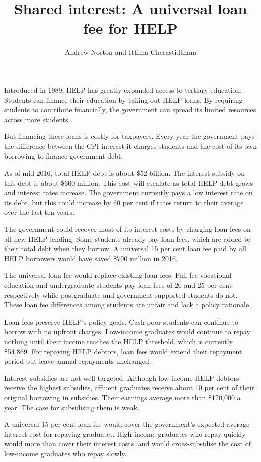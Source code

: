 \documentclass[embargoed]{grattan}
\title{Shared interest: A universal loan fee for HELP}
\author{Andrew Norton and Ittima Cherastidtham}
\begin{document}
\setlength{\overviewExtra}{-2pt}
\begin{overview}
Introduced in 1989, HELP has greatly expanded access to tertiary education. Students can finance their education by taking out HELP loans. By requiring students to contribute financially, the government can spread its limited resources across more students.

But financing these loans is costly for taxpayers. Every year the government pays the difference between the CPI interest it charges students and the cost of its own borrowing to finance government debt.

As of mid-2016, total HELP debt is about \$52 billion. The interest subsidy on this debt is about \$600 million. This cost will escalate as total HELP debt grows and interest rates increase. The government currently pays a low interest rate on its debt, but this could increase by 60 per cent if rates return to their average over the last ten years.

The government could recover most of its interest costs by charging loan fees on all new HELP lending. Some students already pay loan fees, which are added to their total debt when they borrow. A universal 15 per cent loan fee paid by all HELP borrowers would have saved \$700 million in 2016.

The universal loan fee would replace existing loan fees. Full-fee vocational education and undergraduate students pay loan fees of 20 and 25 per cent respectively while postgraduate and government-supported students do not. These loan fee differences among students are unfair and lack a policy rationale.

Loan fees preserve HELP's policy goals. Cash-poor students can continue to borrow with no upfront charges. Low-income graduates would continue to repay nothing until their income reaches the HELP threshold, which is currently \$54,869. For repaying HELP debtors, loan fees would extend their repayment period but leave annual repayments unchanged.

Interest subsidies are not well targeted. Although low-income HELP debtors receive the highest subsidies, affluent graduates receive about 10 per cent of their original borrowing in subsidies. Their earnings average more than \$120,000 a year. The case for subsidising them is weak.

A universal 15 per cent loan fee would cover the government's expected average interest cost for repaying graduates. High income graduates who repay quickly would more than cover their interest costs, and would cross-subsidise the cost of low-income graduates who repay slowly.


\end{overview}
\end{document}
